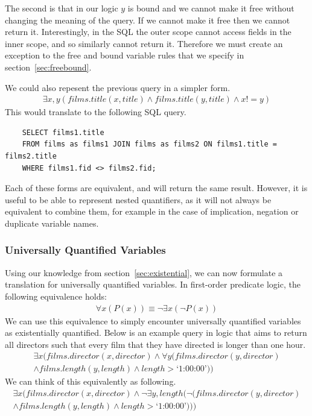 \documentclass[a4paper, 11pt]{article}
\begin{document}
    The second is that in our logic $y$ is bound and we cannot make it free
    without changing the meaning of the query. If we cannot make it free
    then we cannot return it. Interestingly, in the SQL the outer scope cannot
    access fields in the inner scope, and so similarly cannot return it.
    Therefore we must create an exception to the free and bound variable rules
    that we specify in section~\ref{sec:freebound}.

    We could also repesent the previous query in a simpler form.
    \begin{gather}
      \exists x,y(films.title(x, title) \land films.title(y, title)
        \land x != y)
    \end{gather}
    This would translate to the following SQL query.

    \begin{verbatim}
    SELECT films1.title
    FROM films as films1 JOIN films as films2 ON films1.title = films2.title
    WHERE films1.fid <> films2.fid;
    \end{verbatim}

    Each of these forms are equivalent, and will return the same result.
    However, it is useful to be able to represent nested quantifiers, as it
    will not always be equivalent to combine them, for example in the case
    of implication, negation or duplicate variable names\cite{washEQUIV}.

    \subsubsection{Universally Quantified Variables}
    Using our knowledge from section~\ref{sec:existential}, we can now
    formulate a translation for universally quantified variables. In
    first-order predicate logic, the following equivalence holds:
    \begin{gather}
      \forall x(P(x)) \equiv \lnot \exists x(\lnot P(x))
    \end{gather}
    We can use this equivalence to simply encounter universally quantified
    variables as existentially quantified. Below is an example query in logic
    that aims to return all directors such that every film that they have
    directed is longer than one hour.
    \begin{multline}
      \exists x(films.director(x, director) \land \forall y(films.director(y,
      director) \\ \land films.length(y, length) \land length >
      \text{`1:00:00'}))
    \end{multline}
    We can think of this equivalently as following.
    \begin{multline}
      \label{eqn:except}
      \exists x(films.director(x, director) \land \lnot \exists y,length(\lnot(films.director(y,
      director) \\ \land films.length(y, length) \land length > \text{`1:00:00'})))
    \end{multline}
\end{document}
